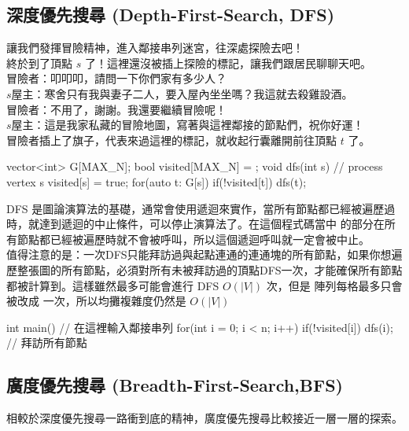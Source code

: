 \subsection{深度優先搜尋 (Depth-First-Search, DFS)}
讓我們發揮冒險精神，進入鄰接串列迷宮，往深處探險去吧！\\

終於到了頂點 $s$ 了！這裡還沒被插上探險的標記，讓我們跟居民聊聊天吧。\\

冒險者：叩叩叩，請問一下你們家有多少人？\\

$s$屋主：寒舍只有我與妻子二人，要入屋內坐坐嗎？我這就去殺雞設酒。\\

冒險者：不用了，謝謝。我還要繼續冒險呢！\\

$s$屋主：這是我家私藏的冒險地圖，寫著與這裡鄰接的節點們，祝你好運！\\

冒險者插上了旗子，代表來過這裡的標記，就收起行囊離開前往頂點 $t$ 了。\\

\begin{C++}
vector<int> G[MAX_N];
bool visited[MAX_N] = {};
void dfs(int s){
    // process vertex s
    visited[s] = true;
    for(auto t: G[s]){
        if(!visited[t]) dfs(t);
    }
}
\end{C++}

DFS 是圖論演算法的基礎，通常會使用遞迴來實作，當所有節點都已經被遍歷過時，就達到遞迴的中止條件，可以停止演算法了。在這個程式碼當中  的部分在所有節點都已經被遍歷時就不會被呼叫，所以這個遞迴呼叫就一定會被中止。\\

值得注意的是：一次DFS只能拜訪過與起點連通的連通塊的所有節點，如果你想遍歷整張圖的所有節點，必須對所有未被拜訪過的頂點DFS一次，才能確保所有節點都被計算到。這樣雖然最多可能會進行 DFS $O(|V|)$ 次，但是  陣列每格最多只會被改成  一次，所以均攤複雜度仍然是 $O(|V|)$

\begin{C++}
int main(){
    // 在這裡輸入鄰接串列
    for(int i = 0; i < n; i++){
        if(!visited[i]) dfs(i); // 拜訪所有節點
    }
}
\end{C++}


\subsection{廣度優先搜尋 (Breadth-First-Search,BFS)}
相較於深度優先搜尋一路衝到底的精神，廣度優先搜尋比較接近一層一層的探索。\\

